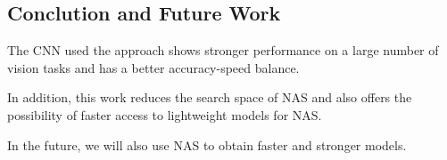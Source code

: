 \documentclass[11pt]{article}
\begin{document}
\subsection{Conclution and Future Work}

The CNN used the approach shows stronger performance on a large number of vision tasks and has a better accuracy-speed balance.

In addition, this work reduces the search space of NAS and also offers the possibility of faster access to lightweight models for NAS.

In the future, we will also use NAS to obtain faster and stronger models.
\end{document}
